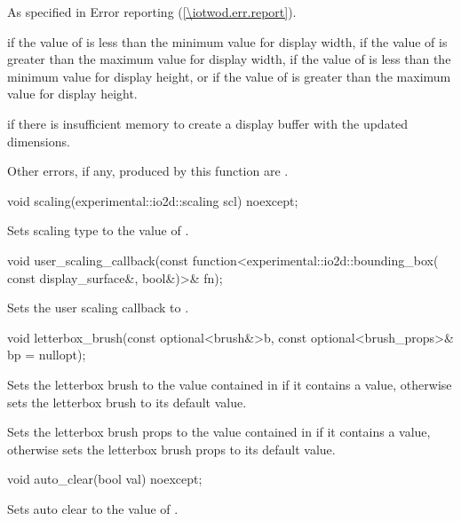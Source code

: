\begin{itemdescr}
\pnum
\throws
As specified in Error reporting (\ref{\iotwod.err.report}).

\pnum
\errors
{} if the value of  is less than the minimum value for display width, if the value of  is greater than the maximum value for display width, if the value of  is less than the minimum value for display height, or if the value of  is greater than the maximum value for display height.

\pnum
{} if there is insufficient memory to create a display buffer with the updated dimensions.

\pnum
Other errors, if any, produced by this function are .
\end{itemdescr}

%
\begin{itemdecl}
void scaling(experimental::io2d::scaling scl) noexcept;
\end{itemdecl}
\begin{itemdescr}
\pnum
\effects
Sets scaling type to the value of .
\end{itemdescr}

%
\begin{itemdecl}
void user_scaling_callback(const function<experimental::io2d::bounding_box(
  const display_surface&, bool&)>& fn);
\end{itemdecl}
\begin{itemdescr}
\pnum
\effects
Sets the user scaling callback to .
\end{itemdescr}

%
\begin{itemdecl}
void letterbox_brush(const optional<brush&>b,
  const optional<brush_props>& bp = nullopt);
\end{itemdecl}
\begin{itemdescr}
\pnum
\effects
Sets the letterbox brush to the value contained in  if it contains a value, otherwise sets the letterbox brush to its default value.

\pnum
Sets the letterbox brush props to the value contained in  if it contains a value, otherwise sets the letterbox brush props to its default value.
\end{itemdescr}

%
\begin{itemdecl}
void auto_clear(bool val) noexcept;
\end{itemdecl}
\begin{itemdescr}
\pnum
\effects
Sets auto clear to the value of .
\end{itemdescr}


